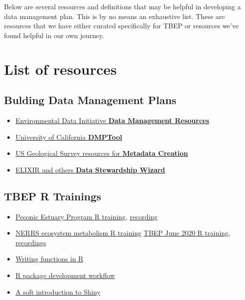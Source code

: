 \documentclass[
]{book}
\providecommand{\tightlist}{%
  \setlength{\itemsep}{0pt}\setlength{\parskip}{0pt}}
\begin{document}
Below are several resources and definitions that may be helpful in developing a data management plan. This is by no means an exhaustive list. These are resources that we have either curated specifically for TBEP or resources we've found helpful in our own journey.

\hypertarget{list-of-resources}{%
\section{List of resources}\label{list-of-resources}}

\hypertarget{bulding-data-management-plans}{%
\subsection{Bulding Data Management Plans}\label{bulding-data-management-plans}}

\begin{itemize}
\tightlist
\item
  \href{https://environmentaldatainitiative.org/dm-resources/}{Environmental Data Initiative \textbf{Data Management Resources}}
\item
  \href{https://dmptool.org/}{University of California \textbf{DMPTool}}
\item
  \href{https://www.usgs.gov/products/data-and-tools/data-management/metadata-creation}{US Geological Survey resources for \textbf{Metadata Creation}}
\item
  \href{https://ds-wizard.org/}{ELIXIR and others \textbf{Data Stewardship Wizard}}
\end{itemize}

\hypertarget{tbep-r-trainings}{%
\subsection{TBEP R Trainings}\label{tbep-r-trainings}}

\begin{itemize}
\tightlist
\item
  \href{https://tbep-tech.github.io/pep-r-training}{Peconic Estuary Program R training}, \href{https://drive.google.com/file/d/1ZjVHFrVpw2uTKZw-BmD29umdbl6viutM/view?usp=sharing}{recording}
\item
  \href{https://tbep-tech.github.io/ecometab-r-training}{NERRS ecosystem metabolism R training}
  \href{https://tbep-tech.github.io/tbep-r-training/}{TBEP June 2020 R training}, \href{https://www.youtube.com/watch?v=_RI4XMRWeV0\&list=PLfJ6-D-exF9RM5TPtT4T0nxieqpr_R4pJ}{recordings}
\item
  \href{https://tbep-tech.github.io/tbep-r-training/functions.html}{Writing functions in R}
\item
  \href{https://tbep-tech.github.io/tbep-r-training/packages.html}{R package development workflow}
\item
  \href{https://tbep-tech.github.io/tbep-r-training/shiny.html}{A soft introduction to Shiny}
\end{itemize}
\end{document}
